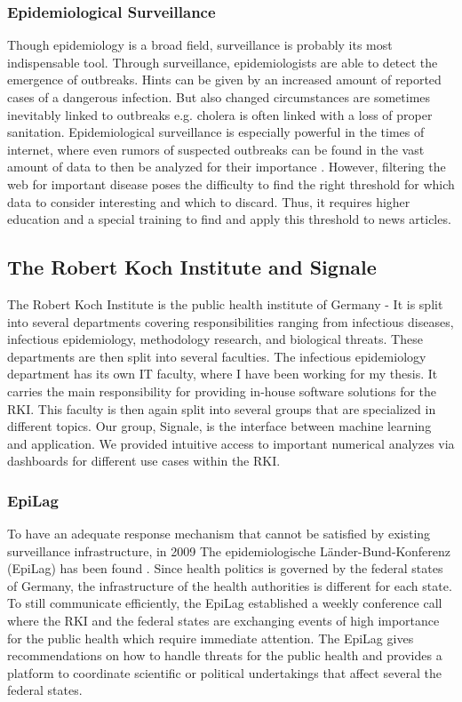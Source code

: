 \subsubsection{Epidemiological Surveillance}

Though epidemiology is a broad field, surveillance is probably its most indispensable tool. Through surveillance,
epidemiologists are able to detect the emergence of outbreaks. Hints can be given by an increased amount of reported cases of a dangerous infection. But also changed circumstances are sometimes inevitably linked to outbreaks e.g. cholera is often linked with a loss of proper sanitation. Epidemiological surveillance is especially powerful in the times of internet, where even rumors of suspected outbreaks can be found in the vast amount of data to then be analyzed for their importance \cite{EpiSurv}. However, filtering the web for important disease poses the difficulty to find the right threshold for which data to consider interesting and which to discard. Thus, it requires higher education and a special training to find and apply this threshold to
news articles.

\subsection{The Robert Koch Institute and Signale}
The Robert Koch Institute is the public health institute of Germany - It is
split into several departments covering responsibilities ranging from infectious diseases, infectious epidemiology, methodology research, and biological threats.
These departments are then split into several faculties. The infectious epidemiology department has its own IT faculty,
where I have been working for my thesis. It carries the main responsibility for providing in-house software solutions for the RKI. This faculty is then again split into several groups that are specialized in different topics.
Our group, Signale, is the interface between machine learning and application.
We provided intuitive access to important numerical analyzes via dashboards for different use cases within the RKI.

\subsubsection{EpiLag}
To have an adequate response mechanism that cannot be satisfied by existing surveillance infrastructure, in 2009 The epidemiologische L\"ander-Bund-Konferenz (\gls{EpiLag}) has been found \cite{EpiLag}. Since health politics is governed by the federal states of Germany, the infrastructure of the health authorities is different for each state. To still communicate efficiently, the EpiLag established a weekly conference call where the RKI and the federal states are exchanging events of high importance for the public health which require immediate attention. The EpiLag gives recommendations on how to handle threats for the public health and provides a platform to coordinate scientific or political undertakings that affect several the federal states.

